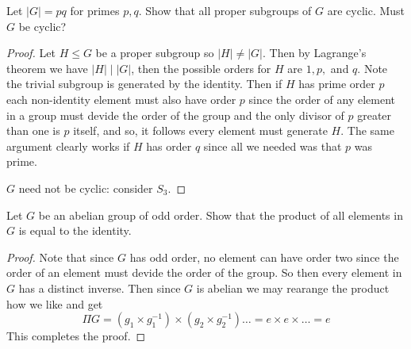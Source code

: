 \documentclass[11pt,largemargins]{homework}
\begin{document}
\maketitle

\question
Let $|G| = pq$ for primes $p,q$. Show that all proper subgroups of $G$ are cyclic. Must $G$ be 
cyclic? 

\begin{proof}
    Let $H \leq G$ be a proper subgroup so $|H| \neq |G|$. Then by Lagrange's theorem we have $|H| \mid |G|$, then the possible orders 
    for $H$ are $1, p,$ and $q$. Note the trivial subgroup is generated by the identity. Then if $H$ has prime order $p$ each non-identity 
    element must also have order $p$ since the order of any element in a group must devide the order of the group and the 
    only divisor of $p$ greater than one is $p$ itself, and so, it follows every element must generate $H$. 
    The same argument clearly works if $H$ has order $q$ since all we needed was that $p$ was prime.
    
    $G$ need not be cyclic: consider $S_3$. 
    
\end{proof}

\question
Let $G$ be an abelian group of odd order. Show that the product of all elements in $G$ is equal to the identity. 

\begin{proof}
    Note that since $G$ has odd order, no element can have order two since the order of an element must devide the order of the group. 
    So then every element in $G$ has a distinct inverse. Then since $G$ is abelian we may rearange the product how we like and get 
    \[\Pi G = (g_1 \times g_1^{ - 1}) \times (g_2 \times g_2^{ - 1}) \dots  = e \times e \times \dots = e\]
    This completes the proof. 
\end{proof}


\end{document}
